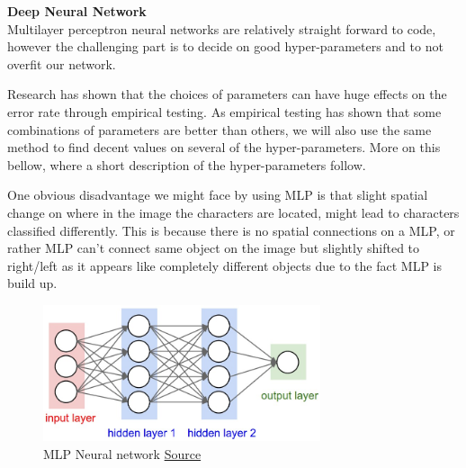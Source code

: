 \documentclass[Report.tex]{subfiles}
\begin{document}
\begin{flushleft}
  \textbf{Deep Neural Network} \\
  Multilayer perceptron neural networks are relatively straight
  forward to code, however the challenging part is to decide on good hyper-parameters and to not overfit our network. \par
  Research has shown that the choices of parameters can have huge effects on the error rate through empirical testing. As empirical testing has shown that some combinations of parameters are better than others, we will also use the same method to find decent values on several of the hyper-parameters. More on this bellow, where a short description of the hyper-parameters follow. \par
  One obvious disadvantage we might face by using MLP is that slight spatial change on where in the image the characters are located, might lead to characters classified differently. This is because there is no spatial connections on a MLP, or rather MLP can't connect same object on the image but slightly shifted to right/left as it appears like completely different objects due to the fact MLP is build up.
\end{flushleft}

\begin{figure}[H]
  \centering
  \includegraphics[height=4cm]{res/neural_net2.jpeg}
  \caption{MLP Neural network \href{http://cs231n.github.io/neural-networks-1/}{Source}}
  \label{fig:neural_net2}
\end{figure}
\end{document}
